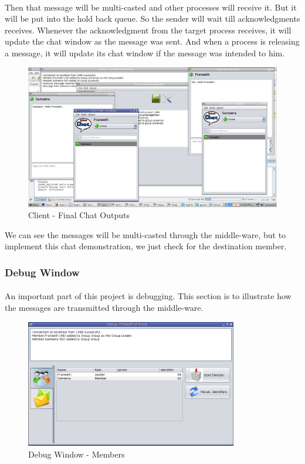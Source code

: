 \documentclass[a4paper,english,twoside]{article}
\begin{document}
\paragraph{}
Then that message will be multi-casted and other processes will receive it. But it will be put into the hold back queue. So the sender will wait till acknowledgments receives. Whenever the acknowledgment from the target process receives, it will update the chat window as the message was sent. And when a process is releasing a message, it will update its chat window if the message was intended to him.

\begin{figure}[h]
\begin{center}
\includegraphics[width=430px]{Client-Chat.png}
\caption{Client - Final Chat Outputs}
\end{center}
\end{figure}

We can see the messages will be multi-casted through the middle-ware, but to implement this chat demonstration, we just check for the destination member.

\newpage
\subsubsection{Debug Window}
\paragraph{}
An important part of this project is debugging. This section is to illustrate how the messages are transmitted through the middle-ware.

\begin{figure}[h]
\begin{center}
\includegraphics[width=350px]{DebugWindow-1.png}
\caption{Debug Window - Members}
\end{center}
\end{figure}
\end{document}
